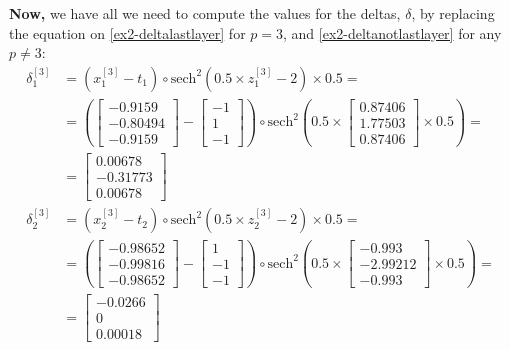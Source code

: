 \documentclass[12pt]{article}
\begin{document}
\begin{enumerate}[leftmargin=\labelsep]
        \textbf{Now,} we have all we need to compute the values for the deltas, $\delta$, by replacing the equation on \eqref{ex2-deltalastlayer} for $p=3$,
        and \eqref{ex2-deltanotlastlayer} for any $p \neq 3$:
        \begingroup
        \allowdisplaybreaks
          \begin{align*}
            \delta^{[3]}_1 &= \left(x^{[3]}_1 - t_1\right) \circ  \text{sech}^{2}\left(0.5\times z^{[3]}_1 - 2\right) \times 0.5 =  \\
            &=  \left(\begin{bmatrix} -0.9159 \\ -0.80494 \\ -0.9159\end{bmatrix} - \begin{bmatrix} -1 \\ 1 \\ -1 \end{bmatrix}\right) \circ \text{sech}^{2}\left(0.5\times \begin{bmatrix} 0.87406 \\ 1.77503 \\ 0.87406\end{bmatrix} \times 0.5\right) = \\
            &= \begin{bmatrix} 0.00678 \\ -0.31773 \\ 0.00678 \end{bmatrix} \\
            \delta^{[3]}_2 &= \left(x^{[3]}_2 - t_2\right) \circ  \text{sech}^{2}\left(0.5\times z^{[3]}_2 - 2\right) \times 0.5 =  \\
            &=  \left(\begin{bmatrix} -0.98652 \\ -0.99816 \\ -0.98652\end{bmatrix} - \begin{bmatrix} 1 \\ -1 \\ -1\end{bmatrix}\right) \circ \text{sech}^{2}\left(0.5\times \begin{bmatrix} -0.993 \\ -2.99212 \\ -0.993\end{bmatrix} \times 0.5\right) = \\
            &= \begin{bmatrix} -0.0266 \\ 0 \\ 0.00018 \end{bmatrix}
          \end{align*}
        \endgroup


\end{enumerate}
\end{document}

